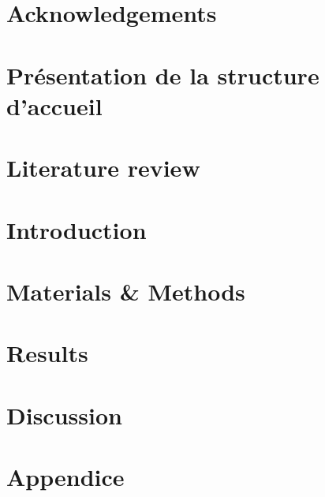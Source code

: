 \documentclass[a4paper, 12pt, hidelinks]{article}
\begin{document}


\newpage

\section{Acknowledgements}

\newpage
\tableofcontents
\listoffigures
\listoftables
\section{Présentation de la structure d'accueil}
\newpage


\section{Literature review}



\section{Introduction}


\section{Materials \& Methods}


\section{Results}


\section{Discussion}







\appendix
\section{Appendice}




\end{document}
